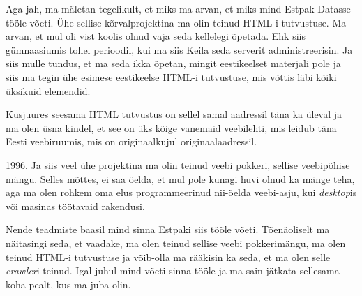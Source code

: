 Aga jah, ma mäletan tegelikult, et miks ma arvan, et miks mind Estpak 
Datasse tööle võeti. Ühe sellise kõrvalprojektina ma olin 
teinud HTML-i tutvustuse. Ma arvan, et mul oli vist koolis olnud vaja seda 
kellelegi õpetada. Ehk siis gümnaasiumis tollel perioodil, kui ma siis Keila 
seda serverit administreerisin. Ja siis mulle tundus, et ma seda ikka õpetan, 
mingit eestikeelset materjali pole ja siis ma tegin ühe esimese  eestikeelse 
HTML-i tutvustuse, mis võttis läbi kõiki üksikuid elemendid. 


Kusjuures seesama HTML tutvustus on sellel samal aadressil täna ka üleval ja ma 
olen üsna kindel, et see on üks kõige vanemaid veebilehti, mis leidub täna 
Eesti veebiruumis, mis on originaalkujul originaalaadressil. 


1996. Ja siis veel ühe projektina ma olin teinud veebi pokkeri, sellise  
veebipõhise mängu. Selles mõttes,  ei saa öelda, et  mul pole kunagi huvi olnud 
ka mänge teha, aga ma olen  rohkem  oma elus programmeerinud nii-öelda 
veebi-asju, kui \emph{desktop}is või masinas töötavaid rakendusi. 

Nende teadmiste baasil mind sinna Estpaki  siis tööle võeti. Tõenäoliselt ma  
näitasingi seda, et vaadake, ma olen teinud sellise veebi pokkerimängu, ma olen 
teinud HTML-i tutvustuse ja võib-olla ma rääkisin ka seda, et ma olen selle 
\emph{crawler}i teinud. Igal juhul mind võeti sinna tööle ja ma sain jätkata 
sellesama koha pealt, kus ma juba olin.


